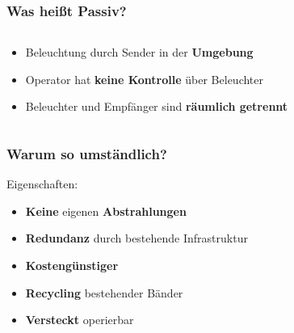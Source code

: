 \begin{frame}
    \frametitle{Was heißt Passiv?}

    \begin{columns}
        \begin{column}{0.6\textwidth}
            \begin{itemize}
                \item Beleuchtung durch Sender in der \textbf{Umgebung}
                \item Operator hat \textbf{keine Kontrolle} über Beleuchter
                \item Beleuchter und Empfänger sind \textbf{räumlich getrennt}
            \end{itemize}
        \end{column}
        \begin{column}{0.4\textwidth}
            \begin{figure}
                \centering
            \end{figure}
        \end{column}
    \end{columns}
\end{frame}

\begin{frame}
    \frametitle{Warum so umständlich?}

    Eigenschaften:
    \begin{itemize}
        \item \textbf{Keine} eigenen \textbf{Abstrahlungen} \faBroadcastTower{}
        \item \textbf{Redundanz} durch bestehende Infrastruktur \faCheckDouble{}
        \item \textbf{Kostengünstiger} \faMoneyBillWave{}
        \item \textbf{Recycling} bestehender Bänder \faRecycle{}
        \item \textbf{Versteckt} operierbar \faEyeSlash{}
    \end{itemize}
\end{frame}
